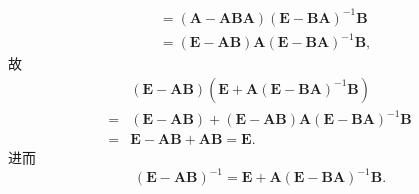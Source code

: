 \documentclass[../../main.tex]{subfiles}
\begin{document}
\begin{solution}
\[\begin{aligned}
&= (\boldsymbol{A} - \boldsymbol{ABA})(\boldsymbol{E} - \boldsymbol{BA})^{-1}\boldsymbol{B} \\
&= (\boldsymbol{E} - \boldsymbol{AB})\boldsymbol{A}(\boldsymbol{E} - \boldsymbol{BA})^{-1}\boldsymbol{B},
\end{aligned}
\]
故
\[
\begin{aligned}
&(\boldsymbol{E} - \boldsymbol{AB})(\boldsymbol{E} + \boldsymbol{A}(\boldsymbol{E} - \boldsymbol{BA})^{-1}\boldsymbol{B}) \\
=& (\boldsymbol{E} - \boldsymbol{AB}) + (\boldsymbol{E} - \boldsymbol{AB})\boldsymbol{A}(\boldsymbol{E} - \boldsymbol{BA})^{-1}\boldsymbol{B} \\
=& \boldsymbol{E} - \boldsymbol{AB} + \boldsymbol{AB} = \boldsymbol{E}.
\end{aligned}
\]
进而
\[
(\boldsymbol{E} - \boldsymbol{AB})^{-1} = \boldsymbol{E} + \boldsymbol{A}(\boldsymbol{E} - \boldsymbol{BA})^{-1}\boldsymbol{B}.
\]
\end{solution}
\end{document}
